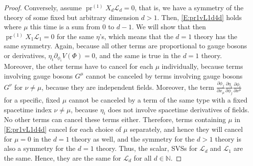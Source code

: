 \documentclass[a4paper,hidelinks, 12pt]{article}
\numberwithin{equation}{section}
\theoremstyle{plain}
\newcommand{\N}[1]{\mathbb{#1}}
\newcommand{\mc}{\mathcal}
\newcommand{\on}{\operatorname}
\begin{document}
\begin{proof}
Conversely, assume $\on{pr}^{(1)}X_d\mc{L}_d=0$, that is, we have a symmetry of the theory of some fixed but arbitrary dimension $d>1$. Then, \eqref{E:pr1vL1d4d} holds where $\mu$ this time is a sum from $0$ to $d-1$. We will show that then $\on{pr}^{(1)}X_1\mc{L}_1=0$ for the same $\eta$'s, which means that the $d=1$ theory has the same symmetry. 
Again, because all other terms are proportional to gauge bosons or derivatives, $\eta_i {\partial_{\phi_i} V(\Phi)}{}=0$, and the same is true in the $d=1$ theory. Moreover, the other terms have to cancel for each $\mu$ individually, because terms involving gauge bosons $G^\mu$ cannot be canceled by terms involving gauge bosons $G^\nu$ for $\nu\ne \mu$, because they are independent fields.
Moreover, the term $\frac{\partial \phi_j}{\partial{x_\mu}}\frac{\partial \eta_i}{\partial\phi_j}\frac{\partial \phi_i}{\partial x^\mu}$
for a specific, fixed $\mu$ cannot be canceled by a term of the same type with a fixed spacetime index $\nu\ne \mu$, because $\eta_i$ does not involve spacetime derivatives of fields. No other terms can cancel these terms either. Therefore, terms containing $\mu$
in \eqref{E:pr1vL1d4d} cancel for each choice of $\mu$ separately, and hence they will cancel for $\mu=0$ in the $d=1$ theory as well, and the symmetry for the $d>1$ theory is also a symmetry for the $d=1$ theory. Thus, the scalar, SVSs for $\mc{L}_d$ and $\mc{L}_1$ are
the same. Hence, they are the same for $\mc{L}_d$ for all $d\in \N{N}$.


\end{proof}
\end{document}
